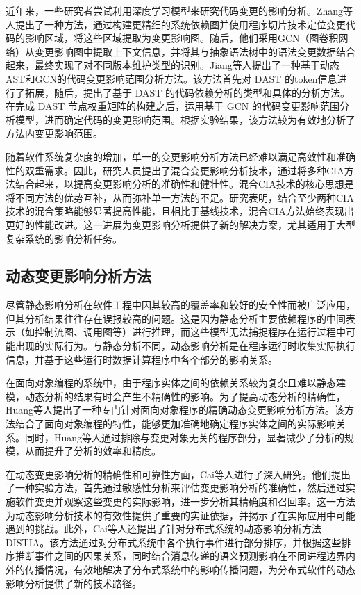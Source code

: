 近年来，一些研究者尝试利用深度学习模型来研究代码变更的影响分析。Zhang等人\cite{10366673}提出了一种方法，通过构建更精细的系统依赖图并使用程序切片技术定位变更代码的影响区域，将这些区域提取为变更影响图。随后，他们采用GCN（图卷积网络）从变更影响图中提取上下文信息，并将其与抽象语法树中的语法变更数据结合起来，最终实现了对不同版本维护类型的识别。Jiang等人\cite{姜瑛2024基于动态}提出了一种基于动态AST和GCN的代码变更影响范围分析方法。该方法首先对 DAST 的token信息进行了拓展，随后，提出了基于 DAST 的代码依赖分析的类型和具体的分析方法。在完成 DAST 节点权重矩阵的构建之后，运用基于 GCN 的代码变更影响范围分析模型，进而确定代码的变更影响范围。根据实验结果，该方法较为有效地分析了方法内变更影响范围。

随着软件系统复杂度的增加，单一的变更影响分析方法已经难以满足高效性和准确性的双重需求。因此，研究人员提出了混合变更影响分析技术，通过将多种CIA方法结合起来，以提高变更影响分析的准确性和健壮性\cite{2021Improving}。混合CIA技术的核心思想是将不同方法的优势互补，从而弥补单一方法的不足。研究表明，结合至少两种CIA技术的混合策略能够显著提高性能，且相比于基线技术，混合CIA方法始终表现出更好的性能改进。这一进展为变更影响分析提供了新的解决方案，尤其适用于大型复杂系统的影响分析任务。


\subsection{动态变更影响分析方法}

尽管静态影响分析在软件工程中因其较高的覆盖率和较好的安全性而被广泛应用，但其分析结果往往存在误报较高的问题。这是因为静态分析主要依赖程序的中间表示（如控制流图、调用图等）进行推理，而这些模型无法捕捉程序在运行过程中可能出现的实际行为。与静态分析不同，动态影响分析是在程序运行时收集实际执行信息，并基于这些运行时数据计算程序中各个部分的影响关系。

在面向对象编程的系统中，由于程序实体之间的依赖关系较为复杂且难以静态建模，动态分析的结果有时会产生不精确性的影响。为了提高动态分析的精确性，Huang等人\cite{2007Precise}提出了一种专门针对面向对象程序的精确动态变更影响分析方法。该方法结合了面向对象编程的特性，能够更加准确地确定程序实体之间的实际影响关系。同时，Huang等人通过排除与变更对象无关的程序部分，显著减少了分析的规模，从而提升了分析的效率和精度。

在动态变更影响分析的精确性和可靠性方面，Cai等人\cite{2015Acom,2014Estimating}进行了深入研究。他们提出了一种实验方法，首先通过敏感性分析来评估变更影响分析的准确性，然后通过实施软件变更并观察这些变更的实际影响，进一步分析其精确度和召回率。这一方法为动态影响分析技术的有效性提供了重要的实证依据，并揭示了在实际应用中可能遇到的挑战。此外，Cai等人还提出了针对分布式系统的动态影响分析方法——DISTIA\cite{2016DistIA}。该方法通过对分布式系统中各个执行事件进行部分排序，并根据这些排序推断事件之间的因果关系，同时结合消息传递的语义预测影响在不同进程边界内外的传播情况，有效地解决了分布式系统中的影响传播问题，为分布式软件的动态影响分析提供了新的技术路径。

